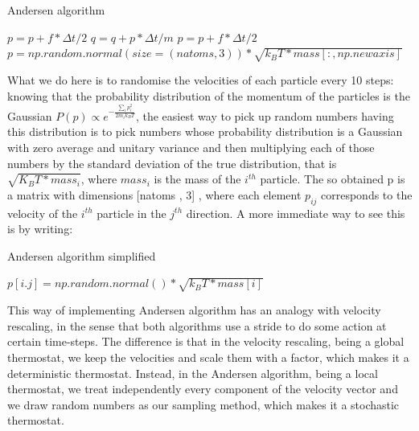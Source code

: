  \begin{algorithm}[H]\label{andersen_algorithm}
			\caption{Andersen algorithm}
			\begin{algorithmic}[1]
				\State $p=p+f*\Delta t/2$
				\State $q=q+p*\Delta t/m$
				\State $p=p+f*\Delta t/2$
				\State $p=np.random.normal(size=(natoms,3))*\sqrt{k_B T*mass[:,np.newaxis]}$
				\EndIf
				\EndFor
			\end{algorithmic}
		\end{algorithm}

What we do here is to randomise the velocities of each particle every 10 steps: knowing that the probability distribution of the momentum of the particles is the Gaussian $P(p)\propto e^{-\frac{\sum_{i}{p_i^2}}{2m_ik_BT}} $, the easiest way to pick up random numbers having this distribution is to pick numbers whose probability distribution is a Gaussian with zero average and unitary variance and then multiplying each of those numbers by the standard deviation of the true distribution, that is $\sqrt{K_B T*mass_i}$, where $mass_i$ is the mass of the $i^{th}$ particle. The so obtained p is a matrix with dimensions [natoms , 3] , where each element $p_{ij}$ corresponds to the velocity of the $i^{th}$ particle in the $j^{th}$ direction.
A more immediate way to see this is by writing:

 \begin{algorithm}[H]\label{andersen_algorithm simplified}
			\caption{Andersen algorithm simplified}
				\begin{algorithmic}[1]
				\State $p[i.j]=np.random.normal()*\sqrt{k_B T * mass[i]}$
				\EndFor
				\EndFor
				\end{algorithmic}
			\end{algorithm}
	 
This way of implementing Andersen algorithm has an analogy with velocity rescaling, in the sense that both algorithms use a stride to do some action at certain time-steps. The difference is that in the velocity rescaling, being a global thermostat, we keep the velocities and scale them with a factor, which makes it a deterministic thermostat. Instead, in the Andersen algorithm, being a local thermostat, we treat independently every component of the velocity vector and we draw random numbers as our sampling method, which makes it a stochastic thermostat.

